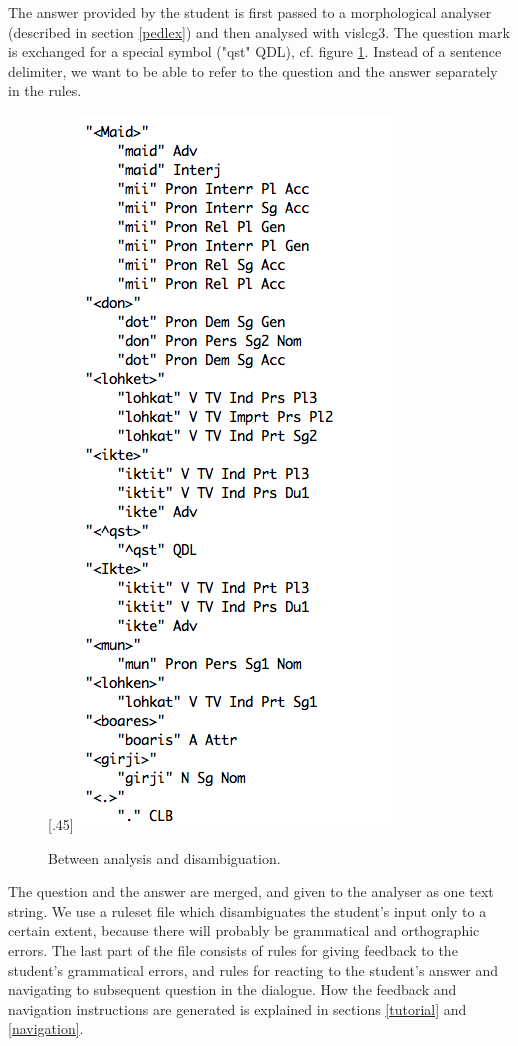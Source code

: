\documentclass[11pt]{article}
\begin{document}
The answer provided by the student is first passed to a morphological analyser (described in section \ref{pedlex}) and then analysed with vislcg3. The question mark is exchanged for a special symbol ("qst" QDL), cf. figure \ref{iktelohken}. Instead of a sentence delimiter, we want to be able to refer to the question and the answer separately in the rules.

\begin{figure}[htb]
\begin{center}
\scalebox{.53}[.45]{\includegraphics{presentation/img/iktelohken3.png}}
\caption{Between analysis and disambiguation.}
\label{iktelohken}
\end{center}
\end{figure}

The question and the answer are merged, and given to the analyser as one text string. We use a ruleset file which disambiguates the student's input only to a certain extent, because there will probably be grammatical and orthographic errors. The last part of the file consists of rules for giving feedback to the student's grammatical errors, and rules for reacting to the student's answer and navigating to subsequent question in the dialogue. How the feedback and navigation instructions are generated is explained in sections \ref{tutorial} and \ref{navigation}.
\end{document}
